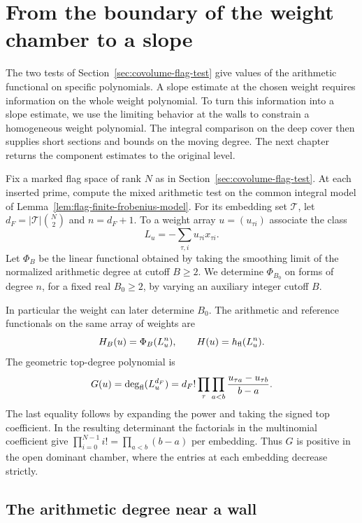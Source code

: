 \section{From the boundary of the weight chamber to a slope}
\label{sec:flag-wall-slope}

The two tests of Section~\ref{sec:covolume-flag-test} give values of the arithmetic functional on specific polynomials. A slope estimate at the chosen weight requires information on the whole weight polynomial. To turn this information into
a slope estimate, we use the limiting behavior at the walls to
constrain a homogeneous weight polynomial. The integral
comparison on the deep cover then supplies short sections and
bounds on the moving degree. The next chapter returns the
component estimates to the original level.

Fix a marked flag space of rank \(N\) as in Section~\ref{sec:covolume-flag-test}. At each inserted prime, compute the mixed arithmetic test on the common integral model of Lemma~\ref{lem:flag-finite-frobenius-model}. For its embedding set \(\mathcal T\), let \(d_F=|\mathcal T|\binom N2\) and \(n=d_F+1\). To a weight array \(u=(u_{\tau i})\) associate the class
\[
 L_u=-\sum_{\tau,i}u_{\tau i}x_{\tau i}.
\]
Let \(\Phi_B\) be the
linear functional obtained by taking the smoothing limit of the
normalized arithmetic degree at cutoff \(B\ge2\). We determine
\(\Phi_{B_0}\) on forms of degree \(n\), for a fixed real
\(B_0\ge2\), by varying an auxiliary integer cutoff \(B\).

In particular the weight can later determine \(B_0\).
The arithmetic and reference functionals on the same array of weights are
\begin{equation}\label{eq:wall-weight-polynomials}
 H_B(u)=\Phi_B(L_u^n),\qquad H(u)=h_{\rm fl}(L_u^n).
\end{equation}
The geometric top-degree polynomial is
\[
 G(u)=\deg_{\rm fl}(L_u^{d_F})
   =d_F!\prod_{\tau}\prod_{a<b}\frac{u_{\tau a}-u_{\tau b}}{b-a}.
\]
The last equality follows by expanding the power and taking
the signed top coefficient. In the resulting determinant the
factorials in the multinomial coefficient give
\(\prod_{i=0}^{N-1} i!=\prod_{a<b}(b-a)\) per embedding.
Thus \(G\) is positive in the open dominant chamber, where
the entries at each embedding decrease strictly.




\subsection{The arithmetic degree near a wall}

